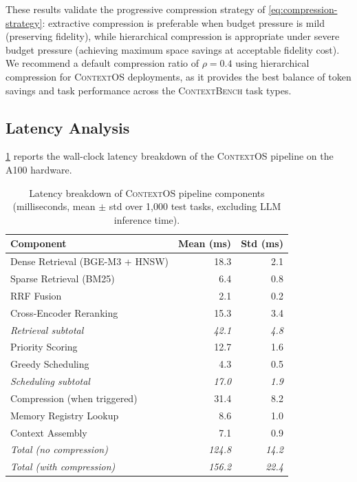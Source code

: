 \documentclass[review,12pt]{elsarticle}
\newcommand{\contextos}{\textsc{ContextOS}}
\newcommand{\contextbench}{\textsc{ContextBench}}
\begin{document}
These results validate the progressive compression strategy of \cref{eq:compression-strategy}:
extractive compression is preferable when budget pressure is mild (preserving
fidelity), while hierarchical compression is appropriate under severe budget
pressure (achieving maximum space savings at acceptable fidelity cost).
We recommend a default compression ratio of $\rho = 0.4$ using hierarchical
compression for \contextos{} deployments, as it provides the best balance of
token savings and task performance across the \contextbench{} task types.

\subsection{Latency Analysis}
\label{subsec:latency}

\cref{tab:latency} reports the wall-clock latency breakdown of the \contextos{}
pipeline on the A100 hardware.

\begin{table}[t]
\centering
\caption{Latency breakdown of \contextos{} pipeline components (milliseconds,
  mean $\pm$ std over 1,000 test tasks, excluding LLM inference time).}
\label{tab:latency}
\begin{tabular}{lrr}
\toprule
\textbf{Component} & \textbf{Mean (ms)} & \textbf{Std (ms)} \\
\midrule
Dense Retrieval (BGE-M3 + HNSW)  & 18.3 & 2.1 \\
Sparse Retrieval (BM25)           & 6.4  & 0.8 \\
RRF Fusion                        & 2.1  & 0.2 \\
Cross-Encoder Reranking           & 15.3 & 3.4 \\
\textit{Retrieval subtotal}       & \textit{42.1} & \textit{4.8} \\
Priority Scoring                  & 12.7 & 1.6 \\
Greedy Scheduling                 & 4.3  & 0.5 \\
\textit{Scheduling subtotal}      & \textit{17.0} & \textit{1.9} \\
Compression (when triggered)      & 31.4 & 8.2 \\
Memory Registry Lookup            & 8.6  & 1.0 \\
Context Assembly                  & 7.1  & 0.9 \\
\textit{Total (no compression)}   & \textit{124.8} & \textit{14.2} \\
\textit{Total (with compression)} & \textit{156.2} & \textit{22.4} \\
\bottomrule
\end{tabular}
\end{table}
\end{document}
